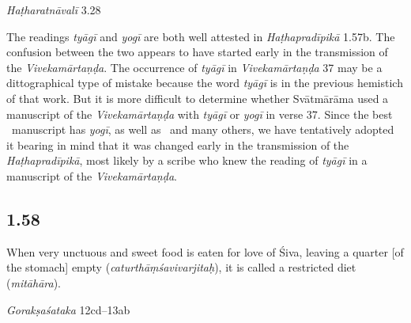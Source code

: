 \begin{ekdosis}
\begin{testimonia}[hp01_057]
\emph{Haṭharatnāvalī}  3.28

\begin{versinnote}
\tl{\var{tyāgī ] yogī P,T,t1}\\!}
\end{versinnote}

\end{testimonia}

\begin{philcomm}[hp01_057]
The readings \emph{tyāgī} and \emph{yogī} are both well attested in \emph{Haṭhapradīpikā} 1.57b. The confusion between the two appears to have started early in the transmission of the \emph{Vivekamārtaṇḍa}. The occurrence of \emph{tyāgī} in \emph{Vivekamārtaṇḍa} 37 may be a dittographical type of mistake because the word \emph{tyāgī} is in the previous hemistich of that work. But it is more difficult to determine whether Svātmārāma used a manuscript of the \emph{Vivekamārtaṇḍa} with \emph{tyāgī} or \emph{yogī} in verse 37. Since the best \textalpha\ manuscript has \emph{yogī}, as well as \etaOne\ and many others, we have tentatively adopted it bearing in mind that it was changed early in the transmission of the \emph{Haṭhapradīpikā}, most likely by a scribe who knew the reading of \emph{tyāgī} in a manuscript of the \emph{Vivekamārtaṇḍa}. 
\end{philcomm}

\subsection*{1.58}
\begin{translation}[hp01_058]
When very unctuous and sweet food is eaten for love of Śiva, leaving a quarter [of the stomach] empty (\emph{caturthāṃśavivarjitaḥ}), it is called a restricted diet (\emph{mitāhāra}).
\end{translation}

\begin{sources}[hp01_058]
\emph{Gorakṣaśataka} 12cd–13ab

\begin{versinnote}
\end{versinnote}


\end{sources}
\end{ekdosis}
